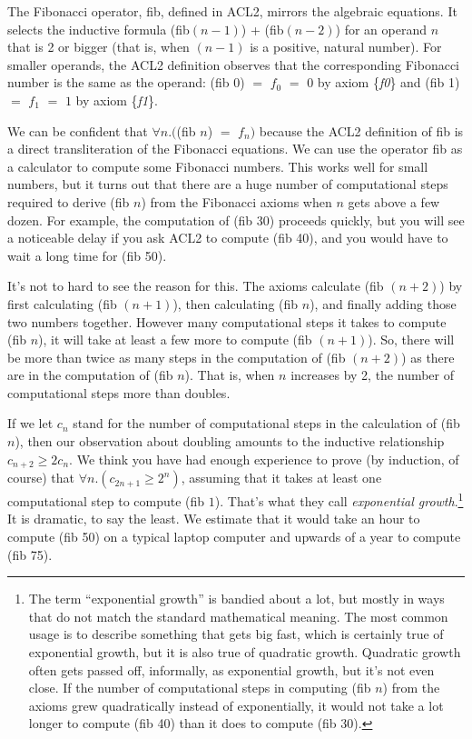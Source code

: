 The Fibonacci operator, \textsf{fib}, defined in ACL2,
mirrors the algebraic equations.
It selects the inductive formula
\textsf{(fib$(n - 1)$) + (fib$(n - 2)$)}
for an operand $n$ that is 2 or bigger
(that is, when $(n-1)$ is a positive, natural number).
For smaller operands, the ACL2 definition
observes that the corresponding Fibonacci number
is the same as the operand:
\textsf{(fib 0)} $=$ $f_0$ $=$ $0$ by axiom \{\emph{f0}\}
and \textsf{(fib 1)} $=$ $f_1$ $=$ $1$ by axiom \{\emph{f1}\}.

We can be confident that $\forall n.($\textsf{(fib $n$)} $=$ $f_n)$
because the ACL2 definition of \textsf{fib} is a direct
transliteration of the Fibonacci equations.
We can use the operator \textsf{fib} as a calculator
to compute some Fibonacci numbers.
This works well for small numbers, but it turns out that there are
a huge number of computational steps required to derive
\textsf{(fib $n$)} from the Fibonacci axioms when $n$ gets above a few dozen.
For example, the computation of \textsf{(fib 30)} proceeds quickly,
but you will see a noticeable delay if you ask ACL2 to compute \textsf{(fib 40)},
and you would have to wait a long time for \textsf{(fib 50)}.

It's not to hard to see the reason for this.
The axioms calculate \textsf{(fib $(n+2)$)} by first calculating
(\textsf{fib $(n+1)$)}, then calculating \textsf{(fib $n$)}, and finally
adding those two numbers together.
However many computational steps it takes to compute \textsf{(fib $n$)},
it will take at least a few more to compute \textsf{(fib $(n+1)$)}.
So, there will be more than twice as many steps in the computation of \textsf{(fib $(n+2)$)}
as there are in the computation of \textsf{(fib $n$)}.
That is, when $n$ increases by 2, the number of computational steps more than doubles.

If we let $c_n$ stand for the number of computational steps in the calculation
of \textsf{(fib $n$)}, then our observation about doubling amounts to the
inductive relationship $c_{n+2} \geq 2c_n$.
We think you have had enough experience to prove (by induction, of course)
that $\forall n.(c_{2n+1} \geq 2^n)$,
assuming that it takes at least one computational step to compute \textsf{(fib $1$)}.
That's what they call \emph{exponential growth}.\footnote{The term
``exponential growth'' is bandied about a lot, but mostly
in ways that do not match the standard mathematical meaning.
The most common usage is to describe something that
gets big fast, which is certainly true of exponential growth,
but it is also true of quadratic growth.
Quadratic growth often gets passed off, informally, as exponential growth,
but it's not even close. If the number of computational steps
in computing \textsf{(fib $n$)} from the axioms grew quadratically instead of exponentially,
it would not take a lot longer to compute \textsf{(fib 40)} than it does to compute \textsf{(fib 30)}.}
It is dramatic, to say the least. We estimate that it would take an hour to compute
\textsf{(fib 50)} on a typical laptop computer and upwards of a year to compute \textsf{(fib 75)}.

